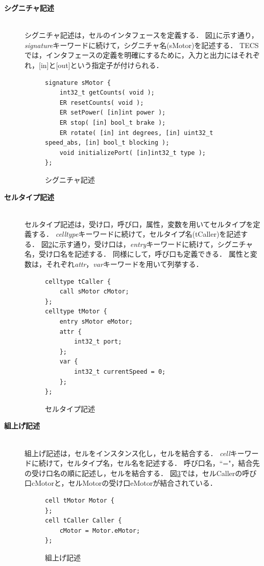 \documentclass[submit,techrep]{ipsj_v2/UTF8/ipsj}
\begin{document}
\begin{description}
    \item[{\bf シグニチャ記述}]\mbox{}\\
        シグニチャ記述は，セルのインタフェースを定義する．
        図\ref{signature}に示す通り，{\it signature}キーワードに続けて，シグニチャ名(sMotor)を記述する．
        TECSでは，インタフェースの定義を明確にするために，入力と出力にはそれぞれ，[in]と[out]という指定子が付けられる．
        
\begin{figure}[t]
\centering
\begin{lstlisting}
signature sMotor {
    int32_t getCounts( void );
    ER resetCounts( void );
    ER setPower( [in]int power );
    ER stop( [in] bool_t brake );
    ER rotate( [in] int degrees, [in] uint32_t speed_abs, [in] bool_t blocking );
    void initializePort( [in]int32_t type );
};
\end{lstlisting}
\caption{シグニチャ記述}
\label{signature}
\end{figure}

    \item[{\bf セルタイプ記述}]\mbox{}\\
        セルタイプ記述は，受け口，呼び口，属性，変数を用いてセルタイプを定義する．
        {\it celltype}キーワードに続けて，セルタイプ名(tCaller)を記述する．
        図\ref{celltype}に示す通り，受け口は，{\it entry}キーワードに続けて，シグニチャ名，受け口名を記述する．
        同様にして，呼び口も定義できる．
        属性と変数は，それぞれ{\it attr}，{\it var}キーワードを用いて列挙する．

\begin{figure}[t]
\centering
\begin{lstlisting}
celltype tCaller {
    call sMotor cMotor;
};
celltype tMotor {
    entry sMotor eMotor;
    attr {
        int32_t port;
    };
    var {
        int32_t currentSpeed = 0;
    };
};
\end{lstlisting}
\caption{セルタイプ記述}  
\label{celltype}
\end{figure}

    \item[{\bf 組上げ記述}]\mbox{}\\
        組上げ記述は，セルをインスタンス化し，セルを結合する．
        {\it cell}キーワードに続けて，セルタイプ名，セル名を記述する．
        呼び口名，``="，結合先の受け口名の順に記述し，セルを結合する．
        図\ref{build}では，セルCallerの呼び口cMotorと，セルMotorの受け口eMotorが結合されている．
        
\begin{figure}[t]
\centering
\begin{lstlisting}
cell tMotor Motor {
};
cell tCaller Caller {
    cMotor = Motor.eMotor;
};
\end{lstlisting}
\caption{組上げ記述}
\label{build}
\end{figure}

\end{description}
\end{document}
